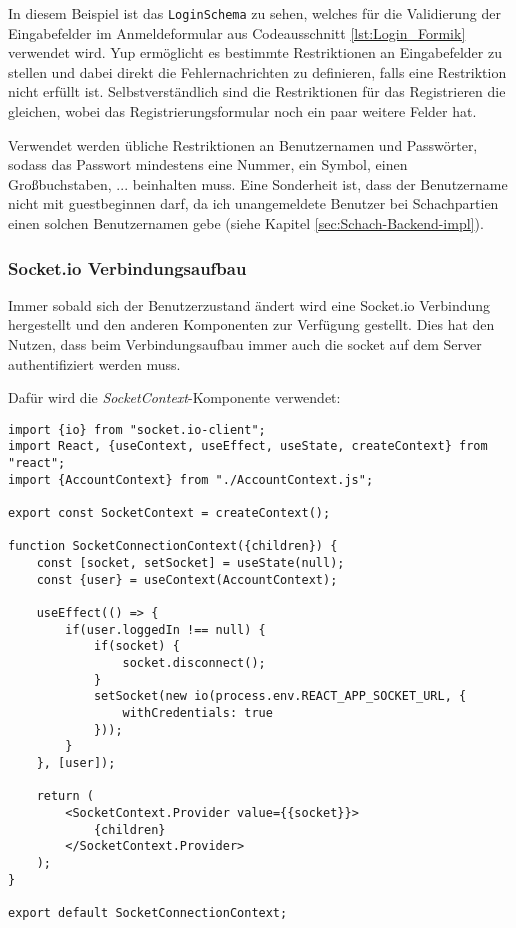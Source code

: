In diesem Beispiel ist das \verb|LoginSchema| zu sehen, welches für die Validierung der Eingabefelder im Anmeldeformular aus Codeausschnitt \ref{lst:Login_Formik} verwendet wird. Yup ermöglicht es bestimmte Restriktionen an Eingabefelder zu stellen und dabei direkt die Fehlernachrichten zu definieren, falls eine Restriktion nicht erfüllt ist. Selbstverständlich sind die Restriktionen für das Registrieren die gleichen, wobei das Registrierungsformular noch ein paar weitere Felder hat.

Verwendet werden übliche Restriktionen an Benutzernamen und Passwörter, sodass das Passwort mindestens eine Nummer, ein Symbol, einen Großbuchstaben, ... beinhalten muss. Eine Sonderheit ist, dass der Benutzername nicht mit \glqq guest\grqq{ }beginnen darf, da ich unangemeldete Benutzer bei Schachpartien einen solchen Benutzernamen gebe (siehe Kapitel \ref{sec:Schach-Backend-impl}). 


\subsubsection{Socket.io Verbindungsaufbau}
\label{sec:socket-Verbindung}
Immer sobald sich der Benutzerzustand ändert wird eine Socket.io Verbindung hergestellt und den anderen Komponenten zur Verfügung gestellt. Dies hat den Nutzen, dass beim Verbindungsaufbau immer auch die socket auf dem Server authentifiziert werden muss.

Dafür wird die \textit{SocketContext}-Komponente verwendet:

\begin{lstlisting}[style=codeStyle, caption={Die Datei \textit{SocketContext.js}}, label={lst:SocketContext}]
import {io} from "socket.io-client";
import React, {useContext, useEffect, useState, createContext} from "react";
import {AccountContext} from "./AccountContext.js";

export const SocketContext = createContext();

function SocketConnectionContext({children}) {
    const [socket, setSocket] = useState(null);
    const {user} = useContext(AccountContext);

    useEffect(() => {
        if(user.loggedIn !== null) {
            if(socket) {
                socket.disconnect();
            }
            setSocket(new io(process.env.REACT_APP_SOCKET_URL, {
                withCredentials: true
            }));
        }
    }, [user]);

    return (
        <SocketContext.Provider value={{socket}}>
            {children}
        </SocketContext.Provider>
    );
}

export default SocketConnectionContext;
\end{lstlisting}

